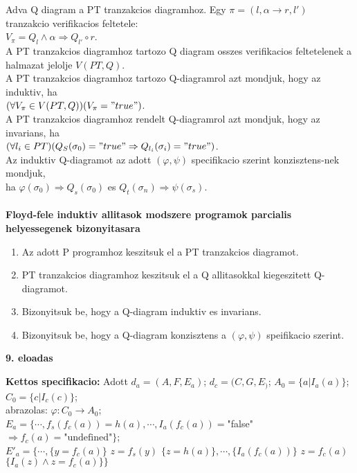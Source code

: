 \documentclass[a4paper,10pt]{article}
\begin{document}
Adva Q diagram a PT tranzakcios diagramhoz. Egy $\pi = (l, \alpha \to r, l')$ tranzakcio verifikacios feltetele:\\
$V_\pi = Q_l \wedge \alpha \Rightarrow Q_{l'} \circ r$.\\
A PT tranzakcios diagramhoz tartozo Q diagram osszes verifikacios feltetelenek a halmazat jelolje $V(PT, Q)$.\\
A PT tranzakcios diagramhoz tartozo Q-diagramrol azt mondjuk, hogy az induktiv, ha\\
$(\forall V_\pi\in V(PT, Q))(V_\pi="true")$.\\
A PT tranzakcios diagramhoz rendelt Q-diagramrol azt mondjuk, hogy az invarians, ha\\
$(\forall l_i\in PT)(Q_S(\sigma_0) = "true" \Rightarrow Q_{l_i}(\sigma_i)="true")$.\\
Az induktiv Q-diagramot az adott $(\varphi, \psi)$ specifikacio szerint konzisztens-nek mondjuk,\\
ha $\varphi(\sigma_0) \Rightarrow Q_s(\sigma_0)$ es $Q_t(\sigma_n) \Rightarrow \psi(\sigma_s)$.\\ \\
\textbf{Floyd-fele induktiv allitasok modszere programok parcialis helyessegenek bizonyitasara}
\begin{enumerate}
\item Az adott P programhoz keszitsuk el a PT tranzakcios diagramot.
\item PT tranzakcios diagramhoz keszitsuk el a Q allitasokkal kiegeszitett Q-diagramot.
\item Bizonyitsuk be, hogy a Q-diagram induktiv es invarians.
\item Bizonyitsuk be, hogy a Q-diagram konzisztens a $(\varphi, \psi)$ speifikacio szerint.
\end{enumerate}
\newpage
%
%
\begin{flushleft}
\textbf{9. eloadas}
\end{flushleft}
\textbf{Kettos specifikacio:} Adott $d_a=(A,F,E_a)$;  $d_c=(C, G, E_)$; $A_0=\lbrace a\vert I_a(a)\rbrace$; $C_0=\lbrace c\vert I_c(c)\rbrace$; \\
abrazolas: $\varphi : C_0 \to A_0$;\\
$E_a=\lbrace\cdots, f_s(f_c(a))=h(a), \cdots,I_a(f_c(a))=$"false"$\Rightarrow f_c(a)=\text{"undefined"}\rbrace$;\\
$E'_a= \lbrace\cdots, \lbrace y=f_c(a)\rbrace$ $z=f_s(y)$ $\lbrace z=h(a)\rbrace, \cdots, \lbrace I_a(f_c(a))\rbrace$ $z=f_c(a)$ $\lbrace I_a(z) \wedge z=f_c(a)\rbrace\rbrace$\\
\end{document}
